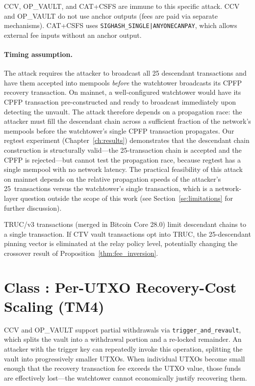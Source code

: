 CCV, OP\_VAULT, and CAT+CSFS are immune to this specific attack. CCV and OP\_VAULT
do not use anchor outputs (fees are paid via separate mechanisms). CAT+CSFS uses
\texttt{SIGHASH\_SINGLE|ANYONECANPAY}, which allows external fee inputs without
an anchor output.

\paragraph{Timing assumption.}
The attack requires the attacker to broadcast all 25 descendant transactions and
have them accepted into mempools \emph{before} the watchtower broadcasts its CPFP
recovery transaction. On mainnet, a well-configured watchtower would have its CPFP
transaction pre-constructed and ready to broadcast immediately upon detecting the
unvault. The attack therefore depends on a propagation race: the attacker must fill
the descendant chain across a sufficient fraction of the network's mempools before
the watchtower's single CPFP transaction propagates. Our regtest experiment
(Chapter~\ref{ch:results}) demonstrates that the descendant chain construction is
structurally valid---the 25-transaction chain is accepted and the CPFP is
rejected---but cannot test the propagation race, because regtest has a single
mempool with no network latency. The practical feasibility of this attack on mainnet
depends on the relative propagation speeds of the attacker's 25~transactions versus
the watchtower's single transaction, which is a network-layer question outside the
scope of this work (see Section~\ref{se:limitations} for further discussion).

TRUC/v3 transactions (merged in Bitcoin Core 28.0) limit descendant chains to a
single transaction. If CTV vault transactions opt into TRUC, the 25-descendant
pinning vector is eliminated at the relay policy level, potentially changing the
crossover result of Proposition~\ref{thm:fee_inversion}.

\section{Class \classscale{}: Per-UTXO Recovery-Cost Scaling (TM4)} \label{se:watchtower_exhaustion}

CCV and OP\_VAULT support partial withdrawals via \texttt{trigger\_and\_revault},
which splits the vault into a withdrawal portion and a re-locked remainder. An
attacker with the trigger key can repeatedly invoke this operation, splitting the
vault into progressively smaller UTXOs. When individual UTXOs become small enough
that the recovery transaction fee exceeds the UTXO value, those funds are
effectively lost---the watchtower cannot economically justify recovering them.

